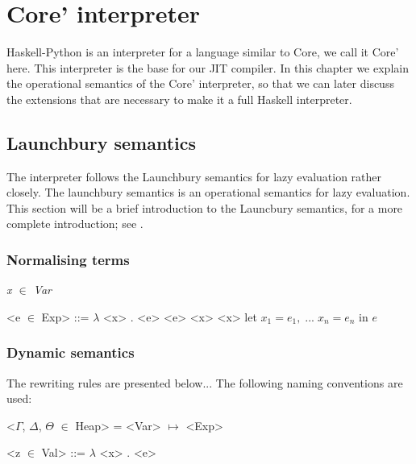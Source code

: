 



\chapter{Core' interpreter}

Haskell-Python is an interpreter for a language similar to Core, we call it Core' here.
This interpreter is the base for our JIT compiler. In this chapter we explain the 
operational semantics of the Core' interpreter, so that we can later discuss the 
extensions that are necessary to make it a full Haskell interpreter.

\section*{Launchbury semantics}

The interpreter follows the Launchbury semantics for lazy evaluation rather closely.
The launchbury semantics is an operational semantics for lazy evaluation. This section
will be a brief introduction to the Launcbury semantics, for a more complete introduction;
see \cite{launchbury1993natural}. 

\subsection*{Normalising terms}

\normalfont\itshape 
x $\in$ Var 
\normalfont
\begin{grammar}
 <e $\in$ Exp> ::= $\lambda$ <x> . <e>
              \alt <e> <x>
              \alt <x>
              \alt let $x_1 = e_1, \; ... \; x_n = e_n$ in $e$
\end{grammar}


\subsection*{Dynamic semantics}

The rewriting rules are presented below... The following naming conventions
are used:

\begin{grammar}
<$\Gamma$, $\Delta$, $\Theta$ $\in$ Heap> = <Var> $\mapsto$ <Exp>

<z $\in$ Val> ::= $\lambda$ <x> . <e>
\end{grammar}

